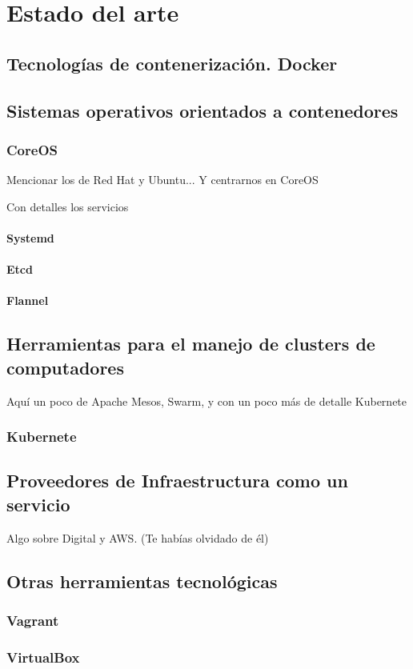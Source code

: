 \chapter{Estado del arte}
\label{cha:state_of_art}


\section{Tecnologías de contenerización. Docker}

\section{Sistemas operativos orientados a contenedores}

\subsection{CoreOS}

 Mencionar los de Red Hat y Ubuntu...
Y centrarnos en CoreOS


Con detalles los servicios

\subsubsection{Systemd}
\subsubsection{Etcd}
\subsubsection{Flannel}

\section{Herramientas para el manejo de clusters de computadores}
Aquí un poco de Apache Mesos, Swarm, y con un poco más de detalle Kubernete

\subsection{Kubernete}

\section{Proveedores de Infraestructura como un servicio}

Algo sobre Digital y AWS. (Te habías olvidado de él)

\section{Otras herramientas tecnológicas}

\subsection{Vagrant}

\subsection{VirtualBox}
